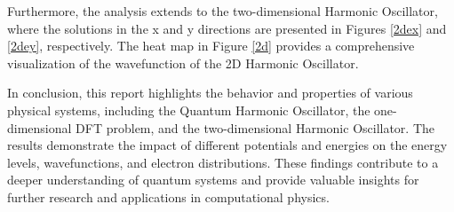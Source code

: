 \documentclass{article}
\begin{document}
\begin{multicols}{2}
Furthermore, the analysis extends to the two-dimensional Harmonic Oscillator, where the solutions in the x and y directions are presented in Figures \ref{2dex} and \ref{2dey}, respectively. The heat map in Figure \ref{2d} provides a comprehensive visualization of the wavefunction of the 2D Harmonic Oscillator.

In conclusion, this report highlights the behavior and properties of various physical systems, including the Quantum Harmonic Oscillator, the one-dimensional DFT problem, and the two-dimensional Harmonic Oscillator. The results demonstrate the impact of different potentials and energies on the energy levels, wavefunctions, and electron distributions. These findings contribute to a deeper understanding of quantum systems and provide valuable insights for further research and applications in computational physics.



\end{multicols}


\end{document}
